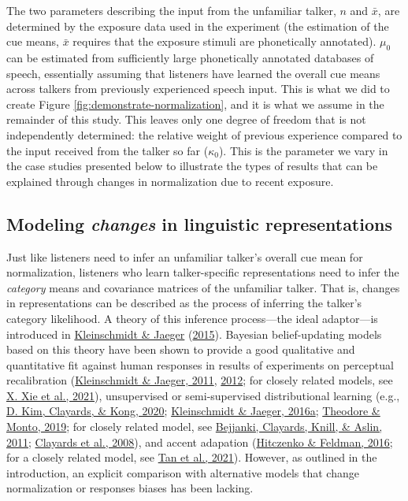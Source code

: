 \documentclass[
  11pt,
  english,
  man,floatsintext]{apa6}
\begin{document}
The two parameters describing the input from the unfamiliar talker, \(n\) and \(\bar{x}\), are determined by the exposure data used in the experiment (the estimation of the cue means, \(\bar{x}\) requires that the exposure stimuli are phonetically annotated). \(\mu_0\) can be estimated from sufficiently large phonetically annotated databases of speech, essentially assuming that listeners have learned the overall cue means across talkers from previously experienced speech input. This is what we did to create Figure \ref{fig:demonstrate-normalization}, and it is what we assume in the remainder of this study. This leaves only one degree of freedom that is not independently determined: the relative weight of previous experience compared to the input received from the talker so far (\(\kappa_0\)). This is the parameter we vary in the case studies presented below to illustrate the types of results that can be explained through changes in normalization due to recent exposure.

\hypertarget{sec:ideal-adaptor}{%
\subsection{\texorpdfstring{Modeling \emph{changes} in linguistic representations}{Modeling changes in linguistic representations}}\label{sec:ideal-adaptor}}

Just like listeners need to infer an unfamiliar talker's overall cue mean for normalization, listeners who learn talker-specific representations need to infer the \emph{category} means and covariance matrices of the unfamiliar talker. That is, changes in representations can be described as the process of inferring the talker's category likelihood. A theory of this inference process---the ideal adaptor---is introduced in \protect\hyperlink{ref-kleinschmidt-jaeger2015}{Kleinschmidt \& Jaeger} (\protect\hyperlink{ref-kleinschmidt-jaeger2015}{2015}). Bayesian belief-updating models based on this theory have been shown to provide a good qualitative and quantitative fit against human responses in results of experiments on perceptual recalibration (\protect\hyperlink{ref-kleinschmidt-jaeger2011}{Kleinschmidt \& Jaeger, 2011}, \protect\hyperlink{ref-kleinschmidt-jaeger2012}{2012}; for closely related models, see \protect\hyperlink{ref-xie2021cognition}{X. Xie et al., 2021}), unsupervised or semi-supervised distributional learning (e.g., \protect\hyperlink{ref-kim2020}{D. Kim, Clayards, \& Kong, 2020}; \protect\hyperlink{ref-kleinschmidt-jaeger2016pbr}{Kleinschmidt \& Jaeger, 2016a}; \protect\hyperlink{ref-theodore-monto2019}{Theodore \& Monto, 2019}; for closely related model, see \protect\hyperlink{ref-bejjanki2011}{Bejjanki, Clayards, Knill, \& Aslin, 2011}; \protect\hyperlink{ref-clayards2008}{Clayards et al., 2008}), and accent adapation (\protect\hyperlink{ref-hitczenko-feldman2016}{Hitczenko \& Feldman, 2016}; for a closely related model, see \protect\hyperlink{ref-tan2021}{Tan et al., 2021}). However, as outlined in the introduction, an explicit comparison with alternative models that change normalization or responses biases has been lacking.
\end{document}
